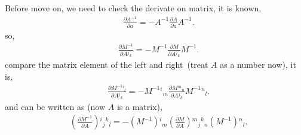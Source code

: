 \begin{tcolorbox}
Before move on, we need to check the derivate on matrix, it is known,
\begin{equation}
\begin{split}
&\frac{\partial A^{-1}}{\partial a} = -A^{-1}\frac{\partial A}{\partial a} A^{-1}.
\end{split}
\end{equation}
so,
\begin{equation}
\begin{split}
&\frac{\partial M^{-1}}{\partial A{}^j{}_k} = -M^{-1}\frac{\partial M}{\partial A{}^j{}_k} M^{-1}.
\end{split}
\end{equation}
compare the matrix element of the left and right~(treat $A$ as a number now), it is,
\begin{equation}
\begin{split}
&\frac{\partial M^{-1}{}^i{}_l}{\partial A{}^j{}_k} = -M^{-1}{}^i{}_m\frac{\partial M{}^m{}_n}{\partial A{}^j{}_k} M^{-1}{}^n{}_l.
\end{split}
\end{equation}
and can be written as (now $A$ is a matrix),
\textcolor[rgb]{1,0,0}{
\begin{equation}
\begin{split}
&\left(\frac{\partial M^{-1}}{\partial A}\right){}^i{}_j{}^k{}_l= -(M^{-1}){}^i{}_m \left(\frac{\partial M}{\partial A}\right){}^m{}_j{}^k{}_n (M^{-1}){}^n{}_l.
\end{split}
\end{equation}
}
\end{tcolorbox}

